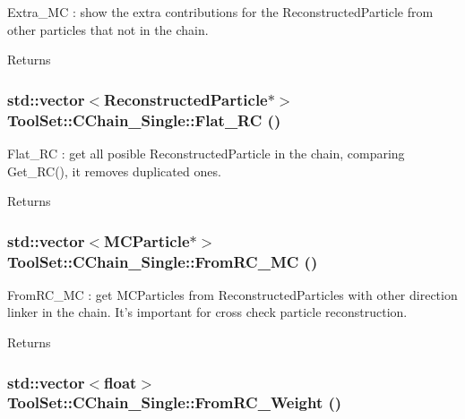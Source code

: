 Extra\_\-MC : show the extra contributions for the ReconstructedParticle from other particles that not in the chain. \begin{DoxyReturn}{Returns}

\end{DoxyReturn}
\hypertarget{classToolSet_1_1CChain__Single_aeead66cb0db211712f4bb5422b706209}{
\subsubsection[{Flat\_\-RC}]{\setlength{\rightskip}{0pt plus 5cm}std::vector$<$ReconstructedParticle$\ast$$>$ ToolSet::CChain\_\-Single::Flat\_\-RC ()}}
\label{classToolSet_1_1CChain__Single_aeead66cb0db211712f4bb5422b706209}


Flat\_\-RC : get all posible ReconstructedParticle in the chain, comparing Get\_\-RC(), it removes duplicated ones. \begin{DoxyReturn}{Returns}

\end{DoxyReturn}
\hypertarget{classToolSet_1_1CChain__Single_a377dc8f0e7ec185636c3e7c6f3c23164}{
\subsubsection[{FromRC\_\-MC}]{\setlength{\rightskip}{0pt plus 5cm}std::vector$<$MCParticle$\ast$$>$ ToolSet::CChain\_\-Single::FromRC\_\-MC ()}}
\label{classToolSet_1_1CChain__Single_a377dc8f0e7ec185636c3e7c6f3c23164}


FromRC\_\-MC : get MCParticles from ReconstructedParticles with other direction linker in the chain. It's important for cross check particle reconstruction.

\begin{DoxyReturn}{Returns}

\end{DoxyReturn}
\hypertarget{classToolSet_1_1CChain__Single_ae52db47ff11ecb7553f38adeaf44ca79}{
\subsubsection[{FromRC\_\-Weight}]{\setlength{\rightskip}{0pt plus 5cm}std::vector$<$float$>$ ToolSet::CChain\_\-Single::FromRC\_\-Weight ()}}
\label{classToolSet_1_1CChain__Single_ae52db47ff11ecb7553f38adeaf44ca79}



